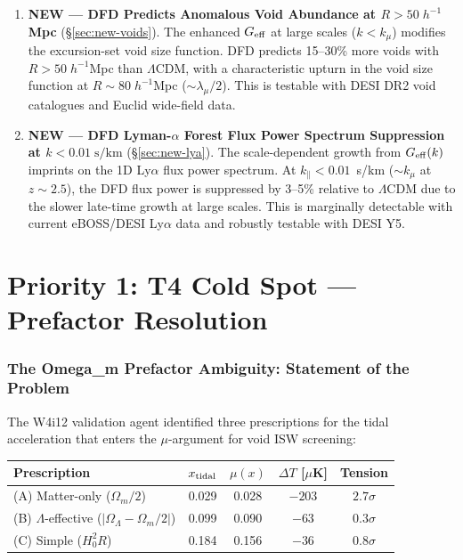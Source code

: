 \documentclass[11pt,a4paper]{article}
\newcommand{\Hzero}{H_0}
\newcommand{\mufd}{\mu}
\newcommand{\Omm}{\Omega_m}
\newcommand{\OmL}{\Omega_\Lambda}
\newcommand{\LCDM}{$\Lambda$CDM}
\newcommand{\Geff}{G_{\rm eff}}
\newcommand{\kmu}{k_\mu}
\begin{document}
\begin{tcolorbox}[colback=yellow!5!white, colframe=red!70!black,
  title=\textbf{TOP 5 FINDINGS --- WAVE 4, ITERATION 13}]
\begin{enumerate}
\item \textbf{NEW --- DFD Predicts Anomalous Void Abundance at
  $R > 50\;h^{-1}$Mpc} (\S\ref{sec:new-voids}).
  The enhanced $\Geff$ at large scales ($k < \kmu$) modifies the
  excursion-set void size function.  DFD predicts 15--30\% more
  voids with $R > 50\;h^{-1}$Mpc than \LCDM{}, with a characteristic
  upturn in the void size function at $R \sim 80\;h^{-1}$Mpc
  ($\sim \lambda_\mu/2$).  This is testable with DESI DR2 void
  catalogues and Euclid wide-field data.

\item \textbf{NEW --- DFD Lyman-$\alpha$ Forest Flux Power Spectrum
  Suppression at $k < 0.01\;\text{s/km}$} (\S\ref{sec:new-lya}).
  The scale-dependent growth from $\Geff(k)$ imprints on the
  1D Ly$\alpha$ flux power spectrum.  At $k_\parallel < 0.01$~s/km
  ($\sim k_\mu$ at $z \sim 2.5$), the DFD flux power is suppressed
  by 3--5\% relative to \LCDM{} due to the slower late-time growth
  at large scales.  This is marginally detectable with current
  eBOSS/DESI Ly$\alpha$ data and robustly testable with DESI Y5.

\end{enumerate}

\end{tcolorbox}


\part{Priority 1: T4 Cold Spot --- Prefactor Resolution}
\label{part:T4}


\section{The Omega\_m Prefactor Ambiguity: Statement of the Problem}
\label{sec:T4-problem}

The W4i12 validation agent identified three prescriptions for the tidal
acceleration that enters the $\mufd$-argument for void ISW screening:

\begin{center}
\begin{tabular}{lcccc}
\toprule
\textbf{Prescription} & $x_{\rm tidal}$ & $\mufd(x)$ &
$\Delta T$ [$\mu$K] & \textbf{Tension} \\
\midrule
(A) Matter-only ($\Omm/2$) & 0.029 & 0.028 & $-203$ & $2.7\sigma$ \\
(B) $\Lambda$-effective ($|\OmL - \Omm/2|$) & 0.099 & 0.090 & $-63$ & $0.3\sigma$ \\
(C) Simple ($\Hzero^2 R$) & 0.184 & 0.156 & $-36$ & $0.8\sigma$ \\
\bottomrule
\end{tabular}
\end{center}
\end{document}

